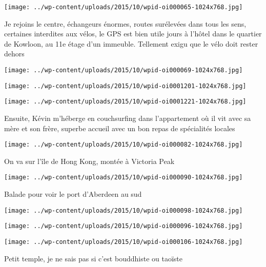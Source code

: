 \centerline{\texttt{[image: ../wp-content/uploads/2015/10/wpid-oi000065-1024x768.jpg]} } 
 \newline
 Je rejoins le centre, échangeurs énormes, routes surélevées dans tous les sens, certaines interdites aux vélos, le GPS est bien utile  jours à l'hôtel dans le quartier de Kowloon, au 11e étage d'un immeuble. Tellement exigu que le vélo doit rester dehors \newline
 \newline
\centerline{\texttt{[image: ../wp-content/uploads/2015/10/wpid-oi000069-1024x768.jpg]} } 
 \newline
 \newline
\centerline{\texttt{[image: ../wp-content/uploads/2015/10/wpid-oi0001201-1024x768.jpg]} } 
 \newline
 \newline
\centerline{\texttt{[image: ../wp-content/uploads/2015/10/wpid-oi0001221-1024x768.jpg]} } 
 \newline
 Ensuite, Kévin m'héberge en couchsurfing dans l'appartement où il vit avec sa mère et son frère, superbe accueil avec un bon repas de spécialités locales \newline
 \newline
\centerline{\texttt{[image: ../wp-content/uploads/2015/10/wpid-oi000082-1024x768.jpg]} } 
 \newline
 On va sur l'île de Hong Kong, montée à Victoria Peak \newline
 \newline
\centerline{\texttt{[image: ../wp-content/uploads/2015/10/wpid-oi000090-1024x768.jpg]} } 
 \newline
 Balade pour voir le port d'Aberdeen au sud \newline
 \newline
\centerline{\texttt{[image: ../wp-content/uploads/2015/10/wpid-oi000098-1024x768.jpg]} } 
 \newline
 \newline
\centerline{\texttt{[image: ../wp-content/uploads/2015/10/wpid-oi000096-1024x768.jpg]} } 
 \newline
 \newline
\centerline{\texttt{[image: ../wp-content/uploads/2015/10/wpid-oi000106-1024x768.jpg]} } 
 \newline
 Petit temple, je ne sais pas si c'est bouddhiste ou taoïste \newline
